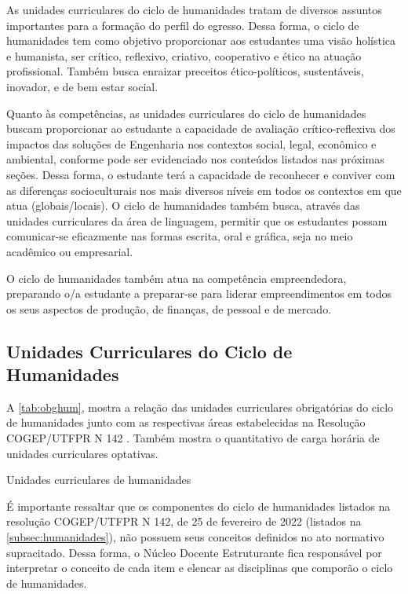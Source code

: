 As unidades curriculares do ciclo de humanidades tratam de diversos assuntos importantes para a formação do perfil do egresso. Dessa forma, o ciclo de humanidades tem como objetivo proporcionar aos estudantes uma visão holística e humanista, ser crítico, reflexivo, criativo, cooperativo e ético na atuação profissional. Também busca enraizar preceitos ético-políticos, sustentáveis, inovador, e de bem estar social.

Quanto às competências, as unidades curriculares do ciclo de humanidades buscam proporcionar ao estudante a capacidade de avaliação crítico-reflexiva dos impactos das soluções de Engenharia nos contextos social, legal, econômico e ambiental, conforme pode ser evidenciado nos conteúdos listados nas próximas seções. Dessa forma, o estudante terá a capacidade de reconhecer e conviver com as diferenças socioculturais nos mais diversos níveis em todos os contextos em que atua (globais/locais). O ciclo de humanidades também busca, através das unidades curriculares da área de linguagem, permitir que os estudantes possam  comunicar-se eficazmente nas formas escrita, oral e gráfica, seja no meio acadêmico ou empresarial.

O ciclo de humanidades também atua na competência empreendedora, preparando o/a estudante a preparar-se para liderar empreendimentos em todos os seus aspectos de produção, de finanças, de pessoal e de mercado.

\subsection{Unidades Curriculares do Ciclo de Humanidades}
\label{subsec:obghumanidades}

A \autoref{tab:obghum}, mostra a relação das unidades curriculares obrigatórias do ciclo de humanidades junto com as respectivas áreas estabelecidas na Resolução COGEP/UTFPR N\textordmasculine{} 142 \cite{cogep142}. Também mostra o quantitativo de carga horária de unidades curriculares optativas.

\begin{table}[!htb]
	\centering\footnotesize
	\caption{Unidades curriculares de humanidades}
	\label{tab:obghum}
\end{table}

É importante ressaltar que os componentes do ciclo de humanidades listados na resolução COGEP/UTFPR N\textordmasculine{} 142, de 25 de fevereiro de 2022 \cite{cogep142} (listados na \autoref{subsec:humanidades}), não possuem seus conceitos definidos no ato normativo supracitado. Dessa forma, o Núcleo Docente Estruturante fica responsável por interpretar o conceito de cada item e elencar as disciplinas que comporão o ciclo de humanidades.


